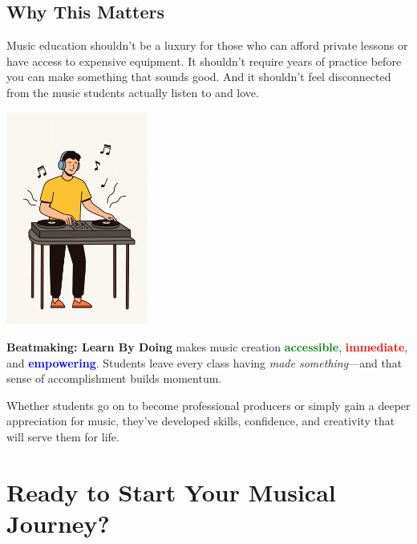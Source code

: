 \documentclass[11pt,letterpaper]{article}
\newcommand{\bluepurple}[1]{\textcolor{blue}{\textbf{#1}}}
\newcommand{\greentext}[1]{\textcolor{green}{\textbf{#1}}}
\newcommand{\redtext}[1]{\textcolor{red}{\textbf{#1}}}
\begin{document}
\vspace{1.5cm}

\subsection*{Why This Matters}

Music education shouldn't be a luxury for those who can afford private lessons or have access to expensive equipment. It shouldn't require years of practice before you can make something that sounds good. And it shouldn't feel disconnected from the music students actually listen to and love.

\begin{center}
\includegraphics[width=0.35\textwidth]{../../assets/images/illustrations/DJ.png}
\end{center}

\textbf{Beatmaking: Learn By Doing} makes music creation \greentext{accessible}, \redtext{immediate}, and \bluepurple{empowering}. Students leave every class having \textit{made something}—and that sense of accomplishment builds momentum.

Whether students go on to become professional producers or simply gain a deeper appreciation for music, they've developed skills, confidence, and creativity that will serve them for life.

\newpage

\section*{Ready to Start Your Musical Journey?}

\begin{center}
\end{center}
\end{document}
